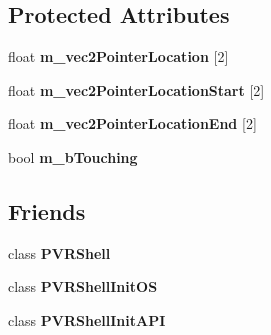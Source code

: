 \subsection*{Protected Attributes}
\begin{DoxyCompactItemize}
\item 
\hypertarget{class_p_v_r_shell_init_a62992aec24a764250e200fa0cd0db7cd}{float {\bfseries m\+\_\+vec2\+Pointer\+Location} \mbox{[}2\mbox{]}}\label{class_p_v_r_shell_init_a62992aec24a764250e200fa0cd0db7cd}

\item 
\hypertarget{class_p_v_r_shell_init_a64f9af40ffa80d4f2f2303b51e1817a2}{float {\bfseries m\+\_\+vec2\+Pointer\+Location\+Start} \mbox{[}2\mbox{]}}\label{class_p_v_r_shell_init_a64f9af40ffa80d4f2f2303b51e1817a2}

\item 
\hypertarget{class_p_v_r_shell_init_a7e6366876593597cd7d8907ffd047c21}{float {\bfseries m\+\_\+vec2\+Pointer\+Location\+End} \mbox{[}2\mbox{]}}\label{class_p_v_r_shell_init_a7e6366876593597cd7d8907ffd047c21}

\item 
\hypertarget{class_p_v_r_shell_init_a5a54a48c448eed763d0fca388a60f406}{bool {\bfseries m\+\_\+b\+Touching}}\label{class_p_v_r_shell_init_a5a54a48c448eed763d0fca388a60f406}

\end{DoxyCompactItemize}
\subsection*{Friends}
\begin{DoxyCompactItemize}
\item 
\hypertarget{class_p_v_r_shell_init_a16c19b3197d6d855ce5675ef3a7f7532}{class {\bfseries P\+V\+R\+Shell}}\label{class_p_v_r_shell_init_a16c19b3197d6d855ce5675ef3a7f7532}

\item 
\hypertarget{class_p_v_r_shell_init_aacf822c891ad81e5d33b8881af9a91f5}{class {\bfseries P\+V\+R\+Shell\+Init\+O\+S}}\label{class_p_v_r_shell_init_aacf822c891ad81e5d33b8881af9a91f5}

\item 
\hypertarget{class_p_v_r_shell_init_aba4126516e7f768e21544adffcd79436}{class {\bfseries P\+V\+R\+Shell\+Init\+A\+P\+I}}\label{class_p_v_r_shell_init_aba4126516e7f768e21544adffcd79436}

\end{DoxyCompactItemize}


